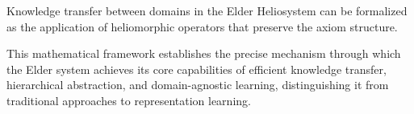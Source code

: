 \begin{corollary}
Knowledge transfer between domains in the Elder Heliosystem can be formalized as the application of heliomorphic operators that preserve the axiom structure.
\end{corollary}

This mathematical framework establishes the precise mechanism through which the Elder system achieves its core capabilities of efficient knowledge transfer, hierarchical abstraction, and domain-agnostic learning, distinguishing it from traditional approaches to representation learning.